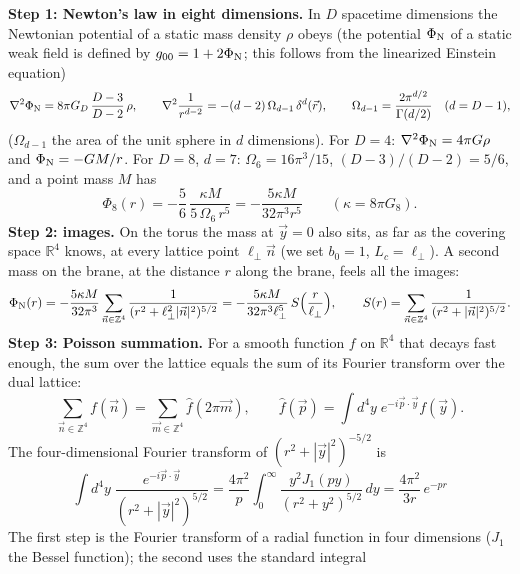 \documentclass[10pt,a4paper]{article}
\begin{document}
\textbf{Step 1: Newton’s law in eight dimensions.} In $D$ spacetime dimensions the Newtonian potential of a static mass density $\rho$ obeys (the potential $\Phi_{\rm N}$ of a static weak field is defined by $g_{00}=1+2\Phi_{\rm N}$; this follows from the linearized Einstein equation)
\begin{equation*}
\nabla^2\Phi_{\rm N}=8\pi G_D\,\frac{D-3}{D-2}\,\rho,\qquad \nabla^2\frac1{r^{d-2}}=-(d-2)\,\Omega_{d-1}\,\delta^d(\vec r),\qquad \Omega_{d-1}=\frac{2\pi^{d/2}}{\Gamma(d/2)}\quad(d=D-1),
\end{equation*}
($\Omega_{d-1}$ the area of the unit sphere in $d$ dimensions). For $D=4$: $\nabla^2\Phi_{\rm N}=4\pi G\rho$ and $\Phi_{\rm N}=-GM/r$. For $D=8$, $d=7$: $\Omega_6=16\pi^3/15$, $(D-3)/(D-2)=5/6$, and a point mass $M$ has
\begin{equation*}
\Phi_8(r)=-\frac56\,\frac{\kappa M}{5\,\Omega_6\,r^5}=-\frac{5\kappa M}{32\pi^3r^5}\qquad(\kappa=8\pi G_8).
\end{equation*}
\textbf{Step 2: images.} On the torus the mass at $\vec y=0$ also sits, as far as the covering space $\mathbb R^4$ knows, at every lattice point $\ell_\perp\vec n$ (we set $b_0=1$, $L_c=\ell_\perp$). A second mass on the brane, at the distance $r$ along the brane, feels all the images:
\begin{equation*}
\Phi_{\rm N}(r)=-\frac{5\kappa M}{32\pi^3}\sum_{\vec n\in\mathbb Z^4}\frac1{(r^2+\ell_\perp^2|\vec n|^2)^{5/2}}=-\frac{5\kappa M}{32\pi^3\ell_\perp^5}\,S\Big(\frac r{\ell_\perp}\Big),\qquad S(r)=\sum_{\vec n\in\mathbb Z^4}\frac1{(r^2+|\vec n|^2)^{5/2}} .
\end{equation*}
\textbf{Step 3: Poisson summation.} For a smooth function $f$ on $\mathbb R^4$ that decays fast enough, the sum over the lattice equals the sum of its Fourier transform over the dual lattice:
\begin{equation*}
\sum_{\vec n\in\mathbb Z^4}f(\vec n)=\sum_{\vec m\in\mathbb Z^4}\hat f(2\pi\vec m),\qquad \hat f(\vec p)=\int d^4y\;e^{-i\vec p\cdot\vec y}f(\vec y).
\end{equation*}
The four-dimensional Fourier transform of $(r^2+|\vec y|^2)^{-5/2}$ is
\begin{equation*}
\int d^4y\;\frac{e^{-i\vec p\cdot\vec y}}{(r^2+|\vec y|^2)^{5/2}}=\frac{4\pi^2}p\int_0^\infty\frac{y^2J_1(py)}{(r^2+y^2)^{5/2}}\,dy=\frac{4\pi^2}{3r}\,e^{-pr}
\end{equation*}
The first step is the Fourier transform of a radial function in four dimensions ($J_1$ the Bessel function); the second uses the standard integral
\end{document}
